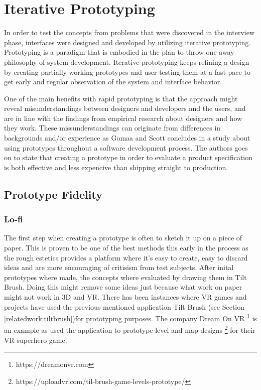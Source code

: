 \section{Iterative Prototyping}
In order to test the concepts from problems that were discovered in the interview phase, interfaces were designed and developed by utilizing iterative prototyping. Prototyping is a paradigm that is embodied in the plan to throw one away philosophy of system development. \cite{proto:Gomaa1981} Iterative prototyping keeps refining a design by creating partially working prototypes and user-testing them at a fast pace to get early and regular observation of the system and interface behavior.\cite{proto:hartson2012ux}

One of the main benefits with rapid prototyping is that the approach might reveal misunderstandings between designers and developers and the users, and are in line with the findings from empirical research about designers and how they work\cite{proto:tripp1990rapid}. These missunderstandings can originate from differences in backgrounds and/or experience as Gomaa and Scott concludes in a study about using prototypes throughout a software development process.\cite{proto:Lichter1993} The authors goes on to state that creating a prototype in order to evaluate a product specification is both effective and less expencive than shipping straight to production.

\subsection{Prototype Fidelity}
\subsubsection{Lo-fi}
\label{method:prototype:lofi}
The first step when creating a prototype is often to sketch it up on a piece of paper. This is proven to be one of the best methods this early in the process as the rough estetics provides a platform where it's easy to create, easy to discard ideas and are more encouraging of critisism from test subjects. \cite{proto:boling1997holistic} After inital prototypes where made, the concepts where evaluated by drawing them in Tilt Brush. Doing this might remove some ideas just because what work on paper might not work in 3D and VR. There has been instances where VR games and projects have used the previous mentioned application Tilt Brush (see Section \ref{relatedwork:tiltbrush})for prototyping purposes. The company Dream On VR \footnote{https://dreamonvr.com} is an example as used the application to prototype level and map designs \footnote{https://uploadvr.com/til-brush-game-levels-prototype/} for their VR superhero game.

